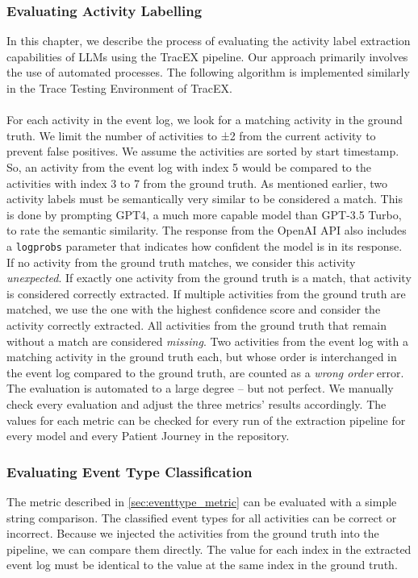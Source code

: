 \subsubsection{Evaluating Activity Labelling}\label{sec:eval_activity}
In this chapter, we describe the process of evaluating the activity label extraction capabilities of LLMs using the TracEX pipeline. Our approach primarily involves the use of automated processes. The following algorithm is implemented similarly in the Trace Testing Environment of TracEX.\\\\
For each activity in the event log, we look for a matching activity in the ground truth. We limit the number of activities to ±2 from the current activity to prevent false positives. We assume the activities are sorted by start timestamp. So, an activity from the event log with index 5 would be compared to the activities with index 3 to 7 from the ground truth. As mentioned earlier, two activity labels must be semantically very similar to be considered a match. This is done by prompting GPT4, a much more capable model than GPT-3.5 Turbo, to rate the semantic similarity. The response from the OpenAI API also includes a \verb|logprobs| parameter that indicates how confident the model is in its response. If no activity from the ground truth matches, we consider this activity \emph{unexpected}. If exactly one activity from the ground truth is a match, that activity is considered correctly extracted. If multiple activities from the ground truth are matched, we use the one with the highest confidence score and consider the activity correctly extracted.  All activities from the ground truth that remain without a match are considered \emph{missing}. Two activities from the event log with a matching activity in the ground truth each, but whose order is interchanged in the event log compared to the ground truth, are counted as a \emph{wrong order} error.\\
The evaluation is automated to a large degree – but not perfect. We manually check every evaluation and adjust the three metrics' results accordingly. The values for each metric can be checked for every run of the extraction pipeline for every model and every Patient Journey in the repository.

\subsubsection{Evaluating Event Type Classification}\label{sec:eval_event_type}
The metric described in \autoref{sec:eventtype_metric} can be evaluated with a simple string comparison. The classified event types for all activities can be correct or incorrect. Because we injected the activities from the ground truth into the pipeline, we can compare them directly. The value for each index in the extracted event log must be identical to the value at the same index in the ground truth.

